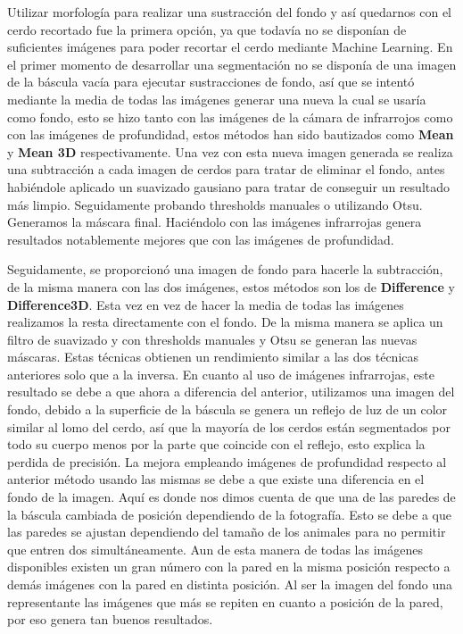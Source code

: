 ﻿\documentclass[10pt,a4paper,twocolumn,twoside]{article}
\begin{document}
 Utilizar morfología para realizar una sustracción del fondo y así quedarnos con el cerdo recortado fue la primera opción, ya que todavía no se disponían de suficientes imágenes para poder recortar el cerdo mediante Machine Learning. En el primer momento de desarrollar una segmentación no se disponía de una imagen de la báscula vacía para ejecutar sustracciones de fondo, así que se intentó mediante la media de todas las imágenes generar una nueva la cual se usaría como fondo, esto se hizo tanto con las imágenes de la cámara de infrarrojos como con las imágenes de profundidad, estos métodos han sido bautizados como \textbf{Mean} y \textbf{Mean 3D} respectivamente. Una vez con esta nueva imagen generada se realiza una subtracción a cada imagen de cerdos para tratar de eliminar el fondo, antes habiéndole aplicado un suavizado gausiano para tratar de conseguir un resultado más limpio. Seguidamente probando thresholds manuales o utilizando Otsu\cite{Otsu}. Generamos la máscara final. Haciéndolo con las imágenes infrarrojas genera resultados notablemente mejores que con las imágenes de profundidad.
    
Seguidamente, se proporcionó una imagen de fondo para hacerle la subtracción, de la misma manera con las dos imágenes, estos métodos son los de \textbf{Difference} y \textbf{Difference3D}. Esta vez en vez de hacer la media de todas las imágenes realizamos la resta directamente con el fondo. De la misma manera se aplica un filtro de suavizado y con thresholds manuales y Otsu se generan las nuevas máscaras. Estas técnicas obtienen un rendimiento similar a las dos técnicas anteriores solo que a la inversa. En cuanto al uso de imágenes infrarrojas, este resultado se debe a que ahora a diferencia del anterior, utilizamos una imagen del fondo, debido a la superficie de la báscula se genera un reflejo de luz de un color similar al lomo del cerdo, así que la mayoría de los cerdos están segmentados por todo su cuerpo menos por la parte que coincide con el reflejo, esto explica la perdida de precisión. La mejora empleando imágenes de profundidad respecto al anterior método usando las mismas se debe a que existe una diferencia en el fondo de la imagen. Aquí es donde nos dimos cuenta de que una de las paredes de la báscula cambiada de posición dependiendo de la fotografía. Esto se debe a que las paredes se ajustan dependiendo del tamaño de los animales para no permitir que entren dos simultáneamente. Aun de esta manera de todas las imágenes disponibles existen un gran número con la pared en la misma posición respecto a demás imágenes con la pared en distinta posición. Al ser la imagen del fondo una representante las imágenes que más se repiten en cuanto a posición de la pared, por eso genera tan buenos resultados.
\end{document}
